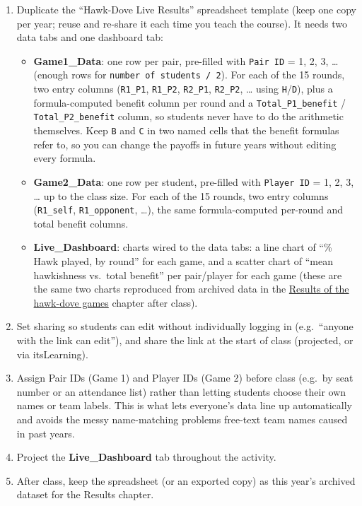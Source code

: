 \documentclass[
  a4paper]{book}
\providecommand{\tightlist}{%
  \setlength{\itemsep}{0pt}\setlength{\parskip}{0pt}}
\begin{document}
\begin{enumerate}
\def\labelenumi{\arabic{enumi}.}
\tightlist
\item
  Duplicate the ``Hawk-Dove Live Results'' spreadsheet template (keep one copy per year; reuse and re-share it each time you teach the course). It needs two data tabs and one dashboard tab:

  \begin{itemize}
  \tightlist
  \item
    \textbf{Game1\_Data}: one row per pair, pre-filled with \texttt{Pair\ ID} = 1, 2, 3, \ldots{} (enough rows for \texttt{number\ of\ students\ /\ 2}). For each of the 15 rounds, two entry columns (\texttt{R1\_P1}, \texttt{R1\_P2}, \texttt{R2\_P1}, \texttt{R2\_P2}, \ldots{} using \texttt{H}/\texttt{D}), plus a formula-computed benefit column per round and a \texttt{Total\_P1\_benefit} / \texttt{Total\_P2\_benefit} column, so students never have to do the arithmetic themselves. Keep \texttt{B} and \texttt{C} in two named cells that the benefit formulas refer to, so you can change the payoffs in future years without editing every formula.
  \item
    \textbf{Game2\_Data}: one row per student, pre-filled with \texttt{Player\ ID} = 1, 2, 3, \ldots{} up to the class size. For each of the 15 rounds, two entry columns (\texttt{R1\_self}, \texttt{R1\_opponent}, \ldots), the same formula-computed per-round and total benefit columns.
  \item
    \textbf{Live\_Dashboard}: charts wired to the data tabs: a line chart of ``\% Hawk played, by round'' for each game, and a scatter chart of ``mean hawkishness vs.~total benefit'' per pair/player for each game (these are the same two charts reproduced from archived data in the \hyperref[results-of-the-hawk-dove-games]{Results of the hawk-dove games} chapter after class).
  \end{itemize}
\item
  Set sharing so students can edit without individually logging in (e.g.~``anyone with the link can edit''), and share the link at the start of class (projected, or via itsLearning).
\item
  Assign Pair IDs (Game 1) and Player IDs (Game 2) before class (e.g.~by seat number or an attendance list) rather than letting students choose their own names or team labels. This is what lets everyone's data line up automatically and avoids the messy name-matching problems free-text team names caused in past years.
\item
  Project the \textbf{Live\_Dashboard} tab throughout the activity.
\item
  After class, keep the spreadsheet (or an exported copy) as this year's archived dataset for the Results chapter.
\end{enumerate}
\end{document}
